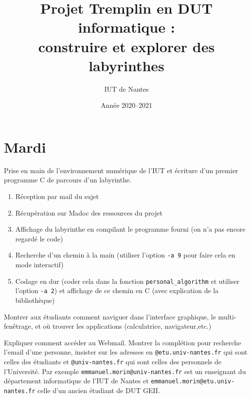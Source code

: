 \documentclass[a4paper]{article}
\title{Projet \textsf{Tremplin en DUT informatique} : \\
construire et explorer des labyrinthes}
\author{IUT de Nantes}
\date{Année 2020--2021}
\newenvironment{objectif}{%
  \begin{framed}%
  \noindent{\bf Objectifs du jour~:}%
}{%
  \end{framed}%
}
\newenvironment{enseignants}[1]{\noindent\color{blue}{\bf #1}}{}
\begin{document}
\maketitle

\section{Mardi}

\begin{objectif}
  Prise en main de l’environnement numérique de l'IUT et écriture d'un premier programme C de parcours d'un labyrinthe.
\end{objectif}

  \begin{enseignants}{Comment ça va se passer~:}
    \begin{enumerate}
    \item Réception par mail du sujet
    \item Récupération sur Madoc des ressources du projet
    \item Affichage du labyrinthe en compilant le programme fourni (on n'a pas encore regardé le code)
    \item Recherche d'un chemin à la main (utiliser l'option \verb|-a 9| pour faire cela en mode interactif)
    \item Codage en dur (coder cela dans la fonction \verb|personal_algorithm| et utiliser l'option \verb|-a 2|) et affichage de ce chemin en C (avec explication de la bibliothèque)
    \end{enumerate}
  \end{enseignants}

\begin{enseignants}{Environnement Linux~:}
Montrer aux étudiants comment naviguer dans l’interface graphique, le multi-fenêtrage, et où trouver les applications (calculatrice, navigateur,etc.)
\end{enseignants}

\begin{enseignants}{Webmail~:}
  Expliquer comment accéder au Webmail.
  Montrer la complétion pour recherche l’email d’une personne, insister sur les adresses en \texttt{@etu.univ-nantes.fr} qui sont celles des étudiants et \texttt{@univ-nantes.fr} qui sont celles des personnels de l’Université. Par exemple \texttt{emmanuel.morin@univ-nantes.fr} est un enseignant du département informatique de l’IUT de Nantes et \texttt{emmanuel.morin@etu.univ-nantes.fr} celle d’un ancien étudiant de DUT GEII.
\end{enseignants}
\end{document}
